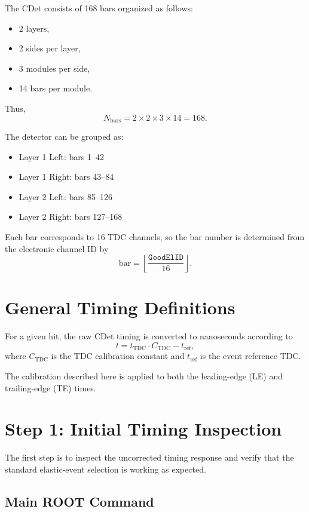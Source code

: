 \documentclass[11pt]{article}
\begin{document}
The CDet consists of 168 bars organized as follows:

\begin{itemize}
    \item 2 layers,
    \item 2 sides per layer,
    \item 3 modules per side,
    \item 14 bars per module.
\end{itemize}

Thus,
\[
N_{\text{bars}} = 2 \times 2 \times 3 \times 14 = 168.
\]

The detector can be grouped as:

\begin{itemize}
    \item Layer 1 Left: bars 1--42
    \item Layer 1 Right: bars 43--84
    \item Layer 2 Left: bars 85--126
    \item Layer 2 Right: bars 127--168
\end{itemize}

Each bar corresponds to 16 TDC channels, so the bar number is determined from the electronic channel ID by
\[
\text{bar} = \left\lfloor \frac{\texttt{GoodElID}}{16} \right\rfloor.
\]

\section{General Timing Definitions}

For a given hit, the raw CDet timing is converted to nanoseconds according to
\[
t = t_{\mathrm{TDC}} \cdot C_{\mathrm{TDC}} - t_{\mathrm{ref}},
\]
where \(C_{\mathrm{TDC}}\) is the TDC calibration constant and \(t_{\mathrm{ref}}\) is the event reference TDC.

The calibration described here is applied to both the leading-edge (LE) and trailing-edge (TE) times.

\section{Step 1: Initial Timing Inspection}

The first step is to inspect the uncorrected timing response and verify that the standard elastic-event selection is working as expected.

\subsection{Main ROOT Command}
\end{document}
